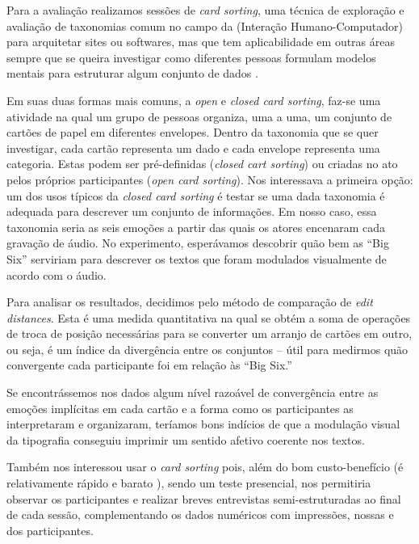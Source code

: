 \documentclass[a4paper]{tufte-handout}
\newcommand{\textls}[2][5]{%
    \begingroup\addfontfeatures{LetterSpace=#1}#2\endgroup
  }
\renewcommand{\smallcapsspacing}[1]{\textls[10]{#1}}
\renewcommand{\textsc}[1]{\smallcapsspacing{\textsmallcaps{#1}}}
\begin{document}
Para a avaliação realizamos sessões de \textit{card sorting}, uma técnica de exploração e avaliação de taxonomias comum no campo da \textsc{ihc} (Interação Humano-Computador) para arquitetar sites ou softwares, mas que tem aplicabilidade em outras áreas sempre que se queira investigar como diferentes pessoas formulam modelos mentais para estruturar algum conjunto de dados \citep{about_cardsorting}.

Em suas duas formas mais comuns, a \textit{open} e \textit{closed card sorting}, faz-se uma atividade na qual um grupo de pessoas organiza, uma a uma, um conjunto de cartões de papel em diferentes envelopes. Dentro da taxonomia que se quer investigar, cada cartão representa um dado e cada envelope representa uma categoria. Estas podem ser pré-definidas (\textit{closed cart sorting}) ou criadas no ato pelos próprios participantes (\textit{open card sorting}). Nos interessava a primeira opção: um dos usos típicos da \textit{closed card sorting} é testar se uma dada taxonomia é adequada para descrever um conjunto de informações. Em nosso caso, essa taxonomia seria as seis emoções a partir das quais os atores encenaram cada gravação de áudio. No experimento, esperávamos descobrir quão bem as ``Big Six'' serviriam para descrever os textos que foram modulados visualmente de acordo com o áudio.

Para analisar os resultados, decidimos pelo método de comparação de \textit{edit distances}. Esta é uma medida quantitativa na qual se obtém a soma de operações de troca de posição necessárias para se converter um arranjo de cartões em outro, ou seja, é um índice da divergência entre os conjuntos -- útil para medirmos quão convergente cada participante foi em relação às ``Big Six.'' \citep{nawaz2012}

Se encontrássemos nos dados algum nível razoável de convergência entre as emoções implícitas em cada cartão e a forma como os participantes as interpretaram e organizaram, teríamos bons indícios de que a modulação visual da tipografia conseguiu imprimir um sentido afetivo coerente nos textos.

Também nos interessou usar o \textit{card sorting} pois, além do bom custo-benefício (é relativamente rápido e barato \citep{goodman2006card}), sendo um teste presencial, nos permitiria observar os participantes e realizar breves entrevistas semi-estruturadas ao final de cada sessão, complementando os dados numéricos com impressões, nossas e dos participantes.
\end{document}
